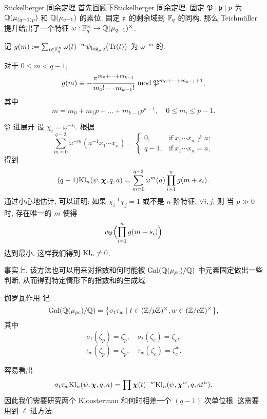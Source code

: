 \documentclass[aspectratio=169,handout]{ctexbeamer}
\renewcommand\emph[1]{{\color{structure.fg!50!blue}{#1}}}
\newcommand\bchi{{\boldsymbol\chi}}
\begin{document}
\begin{frame}{Stickelberger 同余定理}
首先回顾下Stickelberger 同余定理.
固定 ${\mathfrak{P}}\mid {\mathfrak{p}} \mid p$ 为 ${\mathbb{Q}}(\mu_{(q-1)p})$ 和 ${\mathbb{Q}}(\mu_{q-1})$ 的素位.
固定 ${\mathfrak{p}}$ 的剩余域到 ${\mathbb{F}}_q$ 的同构.
那么 Teichm\"uller 提升给出了一个特征 $\omega:{\mathbb{F}}_q^\times\to{\mathbb{Q}}(\mu_{q-1})^\times$.

记 $g(m):=\sum_{t\in{\mathbb{F}}_q^\times}\omega(t)^{-m}\psi_{\log_p q}\bigl({\mathrm{Tr}}(t)\bigr)$ 为 $\omega^{-m}$ 的\emph{高斯和}.

\begin{theorem}
对于 $0\le m<q-1$,
  \[g(m)\equiv -\frac{\pi^{m_0+\dots +m_{k-1}}}{m_0!\cdots m_{k-1}!} \bmod {\mathfrak{P}}^{m_0+\dots+m_{k-1}+1},\]
其中
  \[m=m_0+m_1p+\dots+m_{k-1}p^{k-1},\quad 0\le m_i\le p-1.\]
\end{theorem}
\end{frame}



\begin{frame}{${\mathfrak{P}}$ 进展开}
设 $\chi_i=\omega^{-s_i}$.
根据
\[\sum_{m=0}^{q-2} \omega^{-m}(a^{-1}x_1\cdots x_n)=\begin{cases}
	0,&\text{if}\ x_1\cdots x_n\neq a;\\
	q-1,&\text{if}\ x_1\cdots x_n= a,
\end{cases}\]
得到
\[(q-1)\Kl_n(\psi,\bchi,q,a)=\sum_{m=0}^{q-2}\omega^m(a)\prod_{i=1}^n g(m+s_i).\]
通过小心地估计, 可以证明: 如果 $\chi_i^{-1}\chi_j=1$ 或不是 $n$ 阶特征, $\forall i,j$, 则 当 $p\gg0$ 时, 存在唯一的 $m$ 使得 
\[v_{\mathfrak{P}}\Bigl(\prod_{i=1}^n g(m+s_i)\Bigr)\]
达到最小.
这样我们得到 ${\mathrm{Kl}}_n\neq 0$.

事实上, 该方法也可以用来对指数和何时能被 ${\mathrm{Gal}}({\mathbb{Q}}(\mu_{pc})/{\mathbb{Q}})$ 中元素固定做出一些判断, 从而得到特定情形下的指数和的生成域.
\end{frame}



\begin{frame}{伽罗瓦作用}
记
	\[{\mathrm{Gal}}({\mathbb{Q}}(\mu_{pc})/{\mathbb{Q}})={\left\{\sigma_t\tau_w\mid t\in ({\mathbb{Z}}/p{\mathbb{Z}})^\times,w\in({\mathbb{Z}}/c{\mathbb{Z}})^\times\right\}},\]
其中
	\[\sigma_t(\zeta_p)=\zeta_p^t,\quad \sigma_t(\zeta_c)=\zeta_c,\]
	\[\tau_w(\zeta_p)=\zeta_p,\quad \tau_w(\zeta_c)=\zeta_c^w.\] 

容易看出
	\[\sigma_t\tau_w\Kl_n(\psi,\bchi,q,a)=\prod\bchi(t)^{-w}\Kl_n(\psi,\bchi^w,q,at^n).\]
因此我们需要研究两个 Kloosterman 和何时相差一个 $(q-1)$ 次单位根.
这需要用到 $\ell$ 进方法.
\end{frame}
\end{document}
